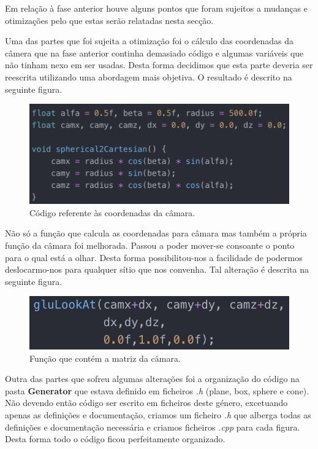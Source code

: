 \documentclass[a4paper]{article}
\begin{document}
Em relação à fase anterior houve alguns pontos que foram sujeitos a mudanças e otimizações pelo que estas serão relatadas nesta secção.

Uma das partes que foi sujeita a otimização foi o cálculo das coordenadas da câmera que na fase anterior continha demasiado código e algumas variáveis que não tinham nexo em ser usadas.
Desta forma decidimos que esta parte deveria ser reescrita utilizando uma abordagem mais objetiva. O resultado é descrito na seguinte figura.

\begin{figure}[H]
\centering
\includegraphics[scale=0.9]{camara.png}
\caption{Código referente às coordenadas da câmara.}
\label{img:camara}
\end{figure}

Não só a função que calcula as coordenadas para câmara mas também a própria função da câmara foi melhorada. Passou a poder mover-se consoante o ponto para o qual está a olhar. Desta forma possibilitou-nos a facilidade de podermos deslocarmo-nos para qualquer sítio que nos convenha. Tal alteração é descrita na seguinte figura.

\begin{figure}[H]
\centering
\includegraphics[scale=0.9]{mat_camara.png}
\caption{Função que contém a matriz da câmara.}
\label{img:mat_camara}
\end{figure}

Outra das partes que sofreu algumas alterações foi a organização do código na pasta \textbf{Generator} que estava definido em ficheiros \emph{.h} (plane, box, sphere e cone). Não devendo então código ser escrito em ficheiros deste género, excetuando apenas as definições e documentação, criamos um ficheiro \emph{.h} que alberga todas as definições e documentação necessária e criamos ficheiros \emph{.cpp} para cada figura. Desta forma todo o código ficou perfeitamente organizado.
\end{document}
